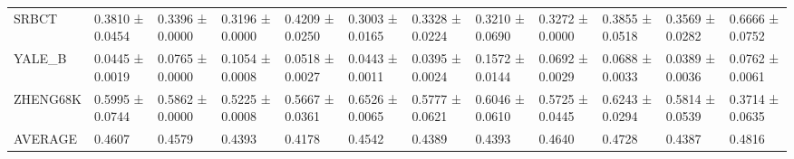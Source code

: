 \begin{tabular}{llllllllllll}
SRBCT & 0.3810 ± 0.0454 & 0.3396 ± 0.0000 & 0.3196 ± 0.0000 & 0.4209 ± 0.0250 & 0.3003 ± 0.0165 & 0.3328 ± 0.0224 & 0.3210 ± 0.0690 & 0.3272 ± 0.0000 & 0.3855 ± 0.0518 & 0.3569 ± 0.0282 & 0.6666 ± 0.0752 \\
YALE_B & 0.0445 ± 0.0019 & 0.0765 ± 0.0000 & 0.1054 ± 0.0008 & 0.0518 ± 0.0027 & 0.0443 ± 0.0011 & 0.0395 ± 0.0024 & 0.1572 ± 0.0144 & 0.0692 ± 0.0029 & 0.0688 ± 0.0033 & 0.0389 ± 0.0036 & 0.0762 ± 0.0061 \\
ZHENG68K & 0.5995 ± 0.0744 & 0.5862 ± 0.0000 & 0.5225 ± 0.0008 & 0.5667 ± 0.0361 & 0.6526 ± 0.0065 & 0.5777 ± 0.0621 & 0.6046 ± 0.0610 & 0.5725 ± 0.0445 & 0.6243 ± 0.0294 & 0.5814 ± 0.0539 & 0.3714 ± 0.0635 \\
AVERAGE & 0.4607 & 0.4579 & 0.4393 & 0.4178 & 0.4542 & 0.4389 & 0.4393 & 0.4640 & 0.4728 & 0.4387 & 0.4816 \\
\bottomrule
\end{tabular}
